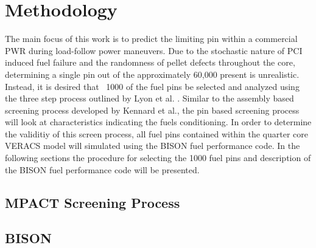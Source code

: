 \documentclass[edeposit,fullpage,11pt]{uiucthesis2009}
\begin{document}
\chapter{Methodology}
The main focus of this work is to predict the limiting pin within a commercial \gls{PWR} during load-follow power maneuvers.
Due to the stochastic nature of \gls{PCI} induced fuel failure and the randomness of pellet defects throughout the core, determining a single pin out of the approximately 60,000 present is unrealistic.
Instead, it is desired that ~1000 of the fuel pins be selected and analyzed using the three step process outlined by Lyon et al. \cite{lyon_pci_2013}.
Similar to the assembly based screening process developed by Kennard et al., the pin based screening process will look at characteristics indicating the fuels conditioning.
In order to determine the validitiy of this screen process, all fuel pins contained within the quarter core \gls{VERACS} model will simulated using the BISON fuel performance code.
In the following sections the procedure for selecting the 1000 fuel pins and description of the BISON fuel performance code will be presented.

\section{MPACT Screening Process}



\section{BISON}
\end{document}
